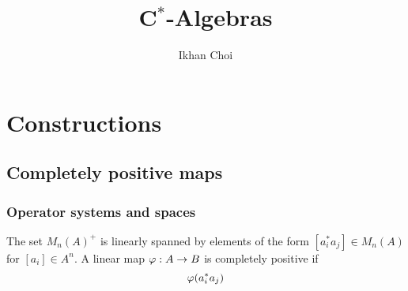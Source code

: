 \documentclass{../../large}
\begin{document}
\title{C$^*$-Algebras}
\author{Ikhan Choi}
\maketitle
\tableofcontents

\part{Constructions}


\chapter{Completely positive maps}
\section{Operator systems and spaces}


\begin{prb}

\end{prb}

\begin{prb}
\end{prb}


The set $M_n(A)^+$ is linearly spanned by elements of the form $[a_i^*a_j]\in M_n(A)$ for $[a_i]\in A^n$.
A linear map $\varphi:A\to B$ is completely positive if
\[\varphi(a_i^*a_j)\]
\end{document}
